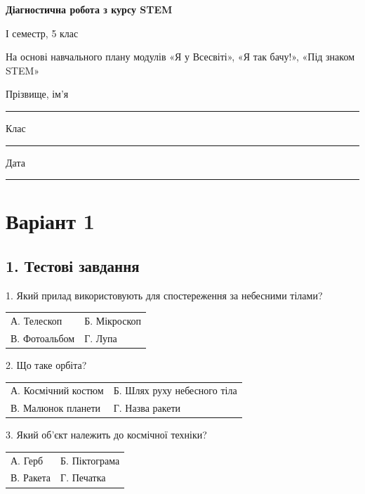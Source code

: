 \documentclass[11pt,a4paper]{article}
\begin{document}
\begin{center}\Large\textbf{Діагностична робота з курсу STEM}\par\large І семестр, 5 клас\end{center}

На основі навчального плану модулів «Я у Всесвіті», «Я так бачу!», «Під знаком STEM»\par

Прізвище, ім'я \rule{0.65\linewidth}{0.4pt}\par

Клас \rule{0.25\linewidth}{0.4pt}    Дата \rule{0.25\linewidth}{0.4pt}\par

\section*{Варіант 1}

\subsection*{1. Тестові завдання}

\begin{minipage}{\linewidth}1. Який прилад використовують для спостереження за небесними тілами?\par\begin{tabularx}{\linewidth}{@{}XX@{}}А. Телескоп & Б. Мікроскоп\\ В. Фотоальбом & Г. Лупа\end{tabularx}\end{minipage}\par

\begin{minipage}{\linewidth}2. Що таке орбіта?\par\begin{tabularx}{\linewidth}{@{}XX@{}}А. Космічний костюм & Б. Шлях руху небесного тіла\\ В. Малюнок планети & Г. Назва ракети\end{tabularx}\end{minipage}\par

\begin{minipage}{\linewidth}3. Який об'єкт належить до космічної техніки?\par\begin{tabularx}{\linewidth}{@{}XX@{}}А. Герб & Б. Піктограма\\ В. Ракета & Г. Печатка\end{tabularx}\end{minipage}\par
\end{document}
